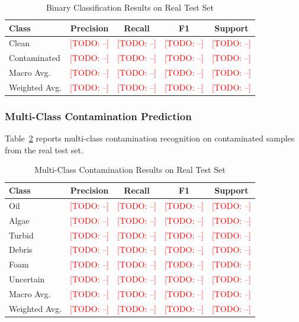\documentclass[journal]{IEEEtran}
\newcommand{\todo}[1]{\textcolor{red}{[TODO: #1]}}
\begin{document}
\begin{table}[!t]
\centering
\caption{Binary Classification Results on Real Test Set}
\label{tab:binary_real_results}
\begin{tabular}{lcccc}
\toprule
\textbf{Class} & \textbf{Precision} & \textbf{Recall} & \textbf{F1} & \textbf{Support} \\
\midrule
Clean & \todo{--} & \todo{--} & \todo{--} & \todo{--} \\
Contaminated & \todo{--} & \todo{--} & \todo{--} & \todo{--} \\
\midrule
Macro Avg. & \todo{--} & \todo{--} & \todo{--} & \todo{--} \\
Weighted Avg. & \todo{--} & \todo{--} & \todo{--} & \todo{--} \\
\bottomrule
\end{tabular}
\end{table}

\subsubsection{Multi-Class Contamination Prediction}
Table~\ref{tab:multiclass_real_results} reports multi-class contamination recognition on contaminated samples from the real test set.

\begin{table}[!t]
\centering
\caption{Multi-Class Contamination Results on Real Test Set}
\label{tab:multiclass_real_results}
\begin{tabular}{lcccc}
\toprule
\textbf{Class} & \textbf{Precision} & \textbf{Recall} & \textbf{F1} & \textbf{Support} \\
\midrule
Oil & \todo{--} & \todo{--} & \todo{--} & \todo{--} \\
Algae & \todo{--} & \todo{--} & \todo{--} & \todo{--} \\
Turbid & \todo{--} & \todo{--} & \todo{--} & \todo{--} \\
Debris & \todo{--} & \todo{--} & \todo{--} & \todo{--} \\
Foam & \todo{--} & \todo{--} & \todo{--} & \todo{--} \\
Uncertain & \todo{--} & \todo{--} & \todo{--} & \todo{--} \\
\midrule
Macro Avg. & \todo{--} & \todo{--} & \todo{--} & \todo{--} \\
Weighted Avg. & \todo{--} & \todo{--} & \todo{--} & \todo{--} \\
\bottomrule
\end{tabular}
\end{table}
\end{document}
